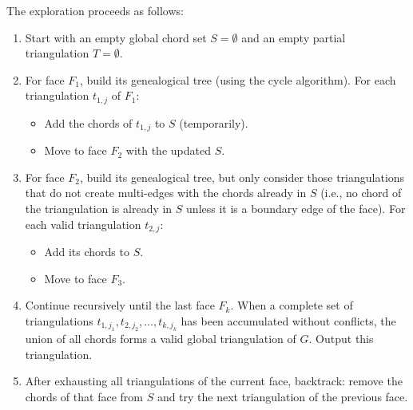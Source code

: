 The exploration proceeds as follows:

\begin{enumerate}
    \item Start with an empty global chord set \(S = \emptyset\) and an empty partial triangulation \(T = \emptyset\).
    \item For face \(F_1\), build its genealogical tree (using the cycle algorithm). 
    For each triangulation \(t_{1,j}\) of \(F_1\):
        \begin{itemize}
            \item Add the chords of \(t_{1,j}\) to \(S\) (temporarily).
            \item Move to face \(F_2\) with the updated \(S\).
        \end{itemize}
    \item For face \(F_2\), build its genealogical tree, but only consider those triangulations that do not create multi-edges with the chords already in \(S\) (i.e., no chord of the triangulation is already in \(S\) unless it is a boundary edge of the face). 
    For each valid triangulation \(t_{2,j}\):
        \begin{itemize}
            \item Add its chords to \(S\).
            \item Move to face \(F_3\).
        \end{itemize}
    \item Continue recursively until the last face \(F_k\). 
    When a complete set of triangulations \(t_{1,j_1}, t_{2,j_2}, \dots, t_{k,j_k}\) has been accumulated without conflicts, the union of all chords forms a valid global triangulation of \(G\). 
    Output this triangulation.
    \item After exhausting all triangulations of the current face, backtrack: remove the chords of that face from \(S\) and try the next triangulation of the previous face.
\end{enumerate}

